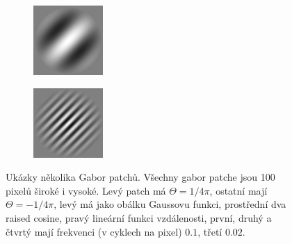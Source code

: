 \begin{figure}[h!]
\begin{subfigure}{0.25\textwidth}
\end{subfigure}%
\begin{subfigure}{0.25\textwidth}
  \centering
  \includegraphics[width=.8\linewidth]{img/gabor3}
\end{subfigure}%
\begin{subfigure}{0.25\textwidth}
  \centering
  \includegraphics[width=.8\linewidth]{img/gabor4}
\end{subfigure}%

\caption{Ukázky několika Gabor patchů. Všechny gabor patche jsou 100 pixelů
široké i vysoké. Levý patch má $\Theta = 1/4\pi$, ostatní mají $\Theta =
-1/4\pi$, levý má jako obálku Gaussovu funkci, prostřední dva raised cosine,
pravý lineární funkci vzdálenosti, první, druhý a čtvrtý mají frekvenci (v
cyklech na pixel) $0.1$, třetí $0.02$.} 

\label{obr:gabor:example} 
 
\end{figure}

